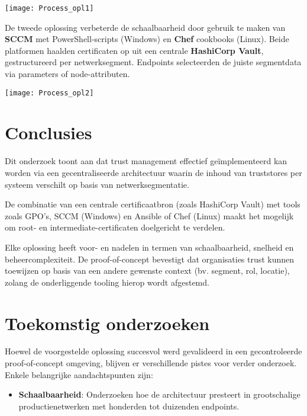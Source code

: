 \documentclass[a0,portrait]{hogent-poster}
\begin{document}
\begin{multicols}{2}
\begin{center}
  \texttt{[image: Process\_opl1]}
\end{center}

De tweede oplossing verbeterde de schaalbaarheid door gebruik te maken van \textbf{SCCM} met PowerShell-scripts (Windows) en \textbf{Chef} cookbooks (Linux). Beide platformen haalden certificaten op uit een centrale \textbf{HashiCorp Vault}, gestructureerd per netwerksegment. Endpoints selecteerden de juiste segmentdata via parameters of node-attributen.

\begin{center}
  \texttt{[image: Process\_opl2]}
\end{center}

\section{Conclusies}

Dit onderzoek toont aan dat trust management effectief geïmplementeerd kan worden via een gecentraliseerde architectuur waarin de inhoud van truststores per systeem verschilt op basis van netwerksegmentatie.

De combinatie van een centrale certificaatbron (zoals HashiCorp Vault) met tools zoals GPO’s, SCCM (Windows) en Ansible of Chef (Linux) maakt het mogelijk om root- en intermediate-certificaten doelgericht te verdelen.

Elke oplossing heeft voor- en nadelen in termen van schaalbaarheid, snelheid en beheercomplexiteit. De proof-of-concept bevestigt dat organisaties trust kunnen toewijzen op basis van een andere gewenste context (bv. segment, rol, locatie), zolang de onderliggende tooling hierop wordt afgestemd.

\section{Toekomstig onderzoeken}

Hoewel de voorgestelde oplossing succesvol werd gevalideerd in een gecontroleerde proof-of-concept omgeving, blijven er verschillende pistes voor verder onderzoek. Enkele belangrijke aandachtspunten zijn:

\begin{itemize}
    \item \textbf{Schaalbaarheid}: Onderzoeken hoe de architectuur presteert in grootschalige productienetwerken met honderden tot duizenden endpoints.
    

\end{itemize}
\end{multicols}
\end{document}
